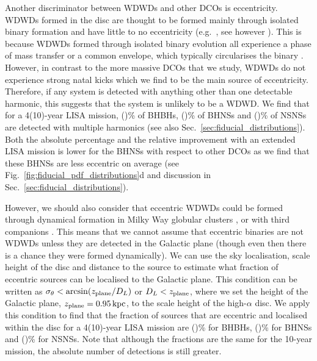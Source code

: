 Another discriminator between WDWDs and other DCOs is eccentricity. WDWDs formed in the disc are thought to be formed mainly through isolated binary formation and have little to no eccentricity (e.g.\ \citealt{Nelemans+2001}, see however \citealt{Dosopoulou+2016a, Dosopoulou+2016b, Gosnell+2019}). This is because WDWDs formed through isolated binary evolution all experience a phase of mass transfer or a common envelope, which typically circularises the binary \citep[e.g.][]{Marsh+2004}. However, in contrast to the more massive DCOs that we study, WDWDs do not experience strong natal kicks which we find to be the main source of eccentricity. Therefore, if any system is detected with anything other than one detectable harmonic, this suggests that the system is unlikely to be a WDWD. We find that for a 4(10)-year LISA mission, \BHBHMultipleHarmonicsFourPerc{}(\BHBHMultipleHarmonicsTenPerc{})\% of BHBHs, \BHNSMultipleHarmonicsFourPerc{}(\BHNSMultipleHarmonicsTenPerc{})\% of BHNSs and \NSNSMultipleHarmonicsFourPerc(\NSNSMultipleHarmonicsTenPerc{})\% of NSNSs are detected with multiple harmonics (see also Sec.~\ref{sec:fiducial_distributions}). Both the absolute percentage and the relative improvement with an extended LISA mission is lower for the BHNSs with respect to other DCOs as we find that these BHNSs are less eccentric on average (see Fig.~\ref{fig:fiducial_pdf_distributions}d and discussion in Sec.~\ref{sec:fiducial_distributions}).

However, we should also consider that eccentric WDWDs could be formed through dynamical formation in Milky Way globular clusters \citep[e.g.][]{Willems+2007, Kremer+2018}, or with third companions \citep[e.g.][]{Antonini+2017}. This means that we cannot assume that eccentric binaries are not WDWDs unless they are detected in the Galactic plane (though even then there is a chance they were formed dynamically). We can use the sky localisation, scale height of the disc and distance to the source to estimate what fraction of eccentric sources can be localised to the Galactic plane. This condition can be written as $\sigma_\theta < \arcsin(z_{\rm plane} / D_L)$ or $D_L < z_{\rm plane}$, where we set the height of the Galactic plane, $z_{\rm plane}=0.95 \unit{kpc}$, to the scale height of the high-$\alpha$ disc. We apply this condition to find that the fraction of sources that are eccentric and localised within the disc for a 4(10)-year LISA mission are \BHBHEccInDiscFourPerc{}(\BHBHEccInDiscTenPerc{})\% for BHBHs, \BHNSEccInDiscFourPerc{}(\BHNSEccInDiscTenPerc{})\% for BHNSs and \NSNSEccInDiscFourPerc{}(\NSNSEccInDiscTenPerc{})\% for NSNSs. Note that although the fractions are the same for the 10-year mission, the absolute number of detections is still greater.

